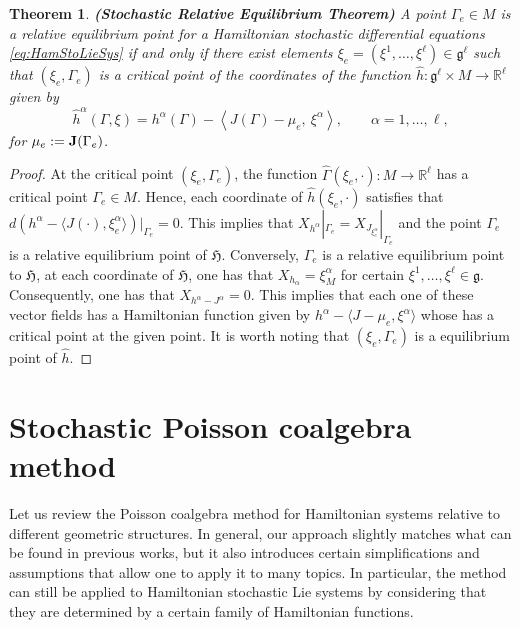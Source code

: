 \documentclass[11pt]{article}
\theoremstyle{plain}
\newtheorem{theorem}{Theorem}[section]
\theoremstyle{definition}
\begin{document}
\begin{theorem}\label{RelativeEquilibrum}
{\bf (Stochastic Relative Equilibrium Theorem)} A point $\Gamma_{e}\in M$ is a relative equilibrium point for a Hamiltonian stochastic differential equations \eqref{eq:HamStoLieSys} if and only if there exist elements $\xi_e=(\xi^1,\ldots,\xi^\ell)\in\mathfrak{g}^\ell$ such that $(\xi_e,\Gamma_{e})$ is a critical point of the coordinates of the function $\widehat{h}:\mathfrak{g}^\ell\times M\rightarrow \mathbb{R}^\ell$ given by
\[\widehat{h}^\alpha(\Gamma,\xi)=h^\alpha(\Gamma)-\left\langle {J}(\Gamma) - \mu_{e},\ \xi^\alpha\right\rangle,\qquad \alpha=1,\ldots,\ell,
\] 
for $\mu_e:={\bf J}(\Gamma_e)$.
\end{theorem}
\begin{proof} At the critical point $(\xi_e,\Gamma_e)$,  the function $\widehat{\Gamma}(\xi_e,\cdot):M\rightarrow \mathbb{R}^\ell$ has a critical point $\Gamma_e\in M$. Hence, each coordinate of $\widehat{h}(\xi_e,\cdot)$ satisfies that $d(h^\alpha-\langle J(\cdot),\xi^\alpha_e\rangle)|_{\Gamma_e}=0$. This implies that $X_{h^\alpha}|_{\Gamma_e}=X_{J_{\xi^\alpha_e}}|_{\Gamma_e}$ and the point $\Gamma_e$ is a relative equilibrium point of $\mathfrak{H}$.  Conversely, $\Gamma_e$ is a relative equilibrium point to $\mathfrak{H}$, at each coordinate of $\mathfrak{H}$, one has that $X_{h_\alpha}=\xi_M^\alpha$ for certain $\xi^1,\ldots,\xi^\ell\in \mathfrak{g}$. Consequently, one has that $X_{h^\alpha-J^\alpha}=0$. This implies that each one of these vector fields has a Hamiltonian function given by $h^\alpha-\langle J-\mu_e,\xi^\alpha\rangle$ whose has a critical point at the given point. It is worth noting that $(\xi_e,\Gamma_e)$ is a equilibrium point of $\widehat{h}$.  
\end{proof}



\section{Stochastic Poisson coalgebra method}\label{Se:PCSLS}

Let us review the Poisson coalgebra method for Hamiltonian systems relative to different geometric structures. In general, our approach slightly matches what can be found in previous works, but it also introduces certain simplifications and assumptions that allow one to apply it to many topics. In particular, the method can still be applied to Hamiltonian stochastic Lie systems by considering that they are determined by a certain family of Hamiltonian functions.
\end{document}

